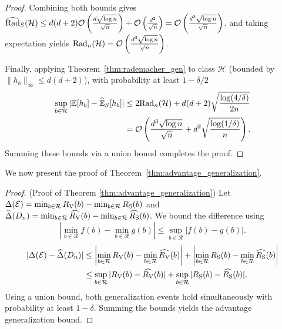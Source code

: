 \begin{proof}
Combining both bounds gives $\widehat{\mathrm{Rad}}_S(\mathcal{H}) \le d(d+2) \mathcal{O}\left( \frac{d \sqrt{\log n}}{\sqrt{n}} \right) + \mathcal{O}\left( \frac{d^2}{\sqrt{n}} \right) = \mathcal{O}\left( \frac{d^3 \sqrt{\log n}}{\sqrt{n}} \right)$, and taking expectation yields $\mathrm{Rad}_n(\mathcal{H}) = \mathcal{O}\left( \frac{d^3 \sqrt{\log n}}{\sqrt{n}} \right)$.

Finally, applying Theorem~\ref{thm:rademacher_gen} to class $\mathcal{H}$ (bounded by $\|h_b\|_\infty \le d(d+2)$), with probability at least $1 - \delta/2$
\begin{equation*}
    \begin{aligned}
    \sup_{b \in \mathcal{R}} |\mathbb{E}[h_b] - \widehat{\mathbb{E}}_S[h_b]| &\le 2\mathrm{Rad}_n(\mathcal{H}) + d(d+2)\sqrt{\frac{\log(4/\delta)}{2n}} \\
    &= \mathcal{O}\left( \frac{d^3 \sqrt{\log n}}{\sqrt{n}} + d^2 \sqrt{\frac{\log(1/\delta)}{n}} \right).
    \end{aligned}
\end{equation*}
Summing these bounds via a union bound completes the proof.
\end{proof}

We now present the proof of Theorem~\ref{thm:advantage_generalization}.

\begin{proof}(Proof of Theorem \ref{thm:advantage_generalization})\label{proof:advantage_generalization}\label{app:proof_advantage_generalization}
Let $\Delta(\mathcal{E}) = \min_{b \in \mathcal{R}}R_{\mathrm{V}}(b) - \min_{b \in \mathcal{R}}R_{\mathrm{S}}(b)$ and $\widehat{\Delta}(D_n) = \min_{b \in \mathcal{R}} \widehat{R_{\mathrm{V}}}(b) - \min_{b \in \mathcal{R}} \widehat{R_{\mathrm{S}}}(b)$. We bound the difference using
\begin{equation*}
    \left| \min_{b \in \mathcal{R}} f(b) - \min_{b \in \mathcal{R}} g(b) \right| \le \sup_{b \in \mathcal{R}} |f(b) - g(b)|.
\end{equation*}
\begin{align*}
    |\Delta(\mathcal{E}) - \widehat{\Delta}(D_n)| &\le \left| \min_{b \in \mathcal{R}} R_{\mathrm{V}}(b) - \min_{b \in \mathcal{R}} \widehat{R_{\mathrm{V}}}(b) \right| + \left| \min_{b \in \mathcal{R}} R_{\mathrm{S}}(b) - \min_{b \in \mathcal{R}} \widehat{R_{\mathrm{S}}}(b) \right| \nonumber \\
    &\le \sup_{b \in \mathcal{R}} |R_{\mathrm{V}}(b) - \widehat{R_{\mathrm{V}}}(b)| + \sup_{b \in \mathcal{R}} |R_{\mathrm{S}}(b) - \widehat{R_{\mathrm{S}}}(b)|.
\end{align*}
Using a union bound, both generalization events hold simultaneously with probability at least $1 - \delta$. Summing the bounds yields the advantage generalization bound.
\end{proof}


